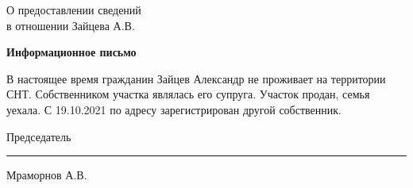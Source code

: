 \begin{flushleft}
	\vspace{10mm}
О предоставлении сведений\\
в отношении Зайцева  А.В.
\end{flushleft}
\vspace{7mm}
\begin{center}
	\Large\textbf{Информационное письмо}
\end{center}
\par

В настоящее время гражданин Зайцев Александр не проживает на территории СНТ. Собственником участка являлась его супруга. Участок продан, семья уехала. С 19.10.2021   по  адресу зарегистрирован другой собственник. 

\vspace{35mm}
Председатель \hfill    \rule{4cm}{0.1 mm}    Мраморнов А.В.




